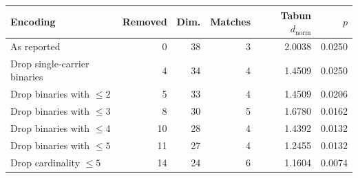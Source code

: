   \begin{tabular}{lrrrrr}
    \hline
    Encoding & Removed & Dim. & Matches & Tabun $d_{\mathrm{norm}}$ & $p$ \\
    \hline
    As reported                  &  0 & 38 & 3 & 2.0038 & 0.0250 \\
    Drop single-carrier binaries &  4 & 34 & 4 & 1.4509 & 0.0250 \\
    Drop binaries with $\le 2$   &  5 & 33 & 4 & 1.4509 & 0.0206 \\
    Drop binaries with $\le 3$   &  8 & 30 & 5 & 1.6780 & 0.0162 \\
    Drop binaries with $\le 4$   & 10 & 28 & 4 & 1.4392 & 0.0132 \\
    Drop binaries with $\le 5$   & 11 & 27 & 4 & 1.2455 & 0.0132 \\
    Drop cardinality $\le 5$     & 14 & 24 & 6 & 1.1604 & 0.0074 \\
    \hline
  \end{tabular}
